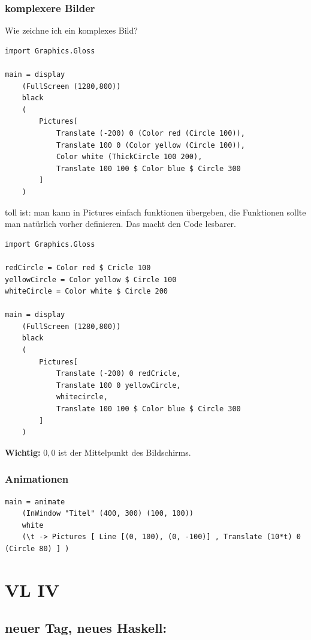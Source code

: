 \documentclass[ngerman,a4paper]{report}
\begin{document}
\subsection{komplexere Bilder}
Wie zeichne ich ein komplexes Bild?\\
\begin{lstlisting}
import Graphics.Gloss

main = display
	(FullScreen (1280,800)) 
	black
	(
		Pictures[
			Translate (-200) 0 (Color red (Circle 100)),
			Translate 100 0 (Color yellow (Circle 100)),
			Color white (ThickCircle 100 200),
			Translate 100 100 $ Color blue $ Circle 300
		]		
	) 
\end{lstlisting}
toll ist: man kann in Pictures einfach funktionen übergeben, die Funktionen sollte man natürlich vorher definieren. Das macht den Code lesbarer.
\begin{lstlisting}
import Graphics.Gloss

redCircle = Color red $ Cricle 100
yellowCircle = Color yellow $ Circle 100
whiteCircle = Color white $ Circle 200

main = display
	(FullScreen (1280,800)) 
	black
	(
		Pictures[
			Translate (-200) 0 redCricle,
			Translate 100 0 yellowCircle,
			whitecircle,
			Translate 100 100 $ Color blue $ Circle 300
		]		
	)
\end{lstlisting}

\textbf{Wichtig:} $0,0$ ist der Mittelpunkt des Bildschirms.

\subsection{Animationen}
\begin{lstlisting}
main = animate
	(InWindow "Titel" (400, 300) (100, 100))
	white
	(\t -> Pictures [ Line [(0, 100), (0, -100)] , Translate (10*t) 0 (Circle 80) ] )
\end{lstlisting}

\chapter{VL IV}
\section{neuer Tag, neues Haskell:}
\end{document}
